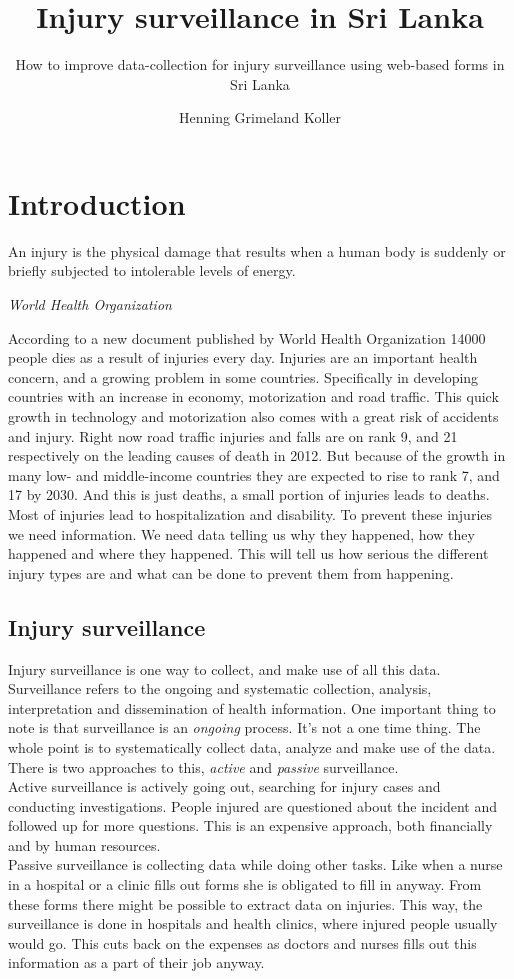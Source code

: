 \documentclass[UKenglish, 12pt]{article}
\title{Injury surveillance in Sri Lanka}
\subtitle{How to improve data-collection for injury surveillance
using web-based forms in Sri Lanka}
\author{Henning Grimeland Koller}
\newcommand{\WHO}{World Health Organization }
\begin{document}
\ififorside{}
\newpage

\section*{Introduction} 
\epigraph{ An injury is the physical damage that
results when a human body is suddenly or briefly subjected to intolerable
levels of energy.}{\textit{\WHO\cite{who-guide}}}

According to a new document published by \WHO\cite{who-article} 14000 people
dies as a result of injuries every day.  Injuries are an important health
concern, and a growing problem in some countries. Specifically in developing
countries with an increase in economy, motorization and road traffic.  This
quick growth in technology and motorization also comes with a great risk of
accidents and injury.  Right now road traffic injuries and falls are on rank 9,
and 21 respectively on the leading causes of death in
2012.\cite[4]{who-article} But because of the growth in many low- and
middle-income countries they are expected to rise to rank 7, and 17 by 2030.
And this is just deaths, a small portion of injuries leads to deaths. Most of
injuries lead to hospitalization and disability.  To prevent these injuries we
need information. We need data telling us why they happened, how they happened
and where they happened.  This will tell us how serious the different injury
types are and what can be done to prevent them from happening.

\subsection*{Injury surveillance}
Injury surveillance is one way to collect, and
make use of all this data.  Surveillance refers to the ongoing and systematic
collection, analysis, interpretation and dissemination of health
information.\cite[11]{who-guide} One important thing to note is that
surveillance is an \textit{ongoing} process.  It's not a one time thing. The
whole point is to systematically collect data, analyze and make use of the
data.  There is two approaches to this, \textit{active} and \textit{passive}
surveillance. \\Active surveillance is actively going out, searching for injury
cases and conducting investigations.  People injured are questioned about the
incident and followed up for more questions. This is an expensive approach,
both financially and by human resources. \\Passive surveillance is collecting
data while doing other tasks.  Like when a nurse in a hospital or a clinic
fills out forms she is obligated to fill in anyway. From these forms there
might be possible to extract data on injuries. This way, the surveillance is
done in hospitals and health clinics, where injured people usually would go.
This cuts back on the expenses as doctors and nurses fills out this information
as a part of their job anyway.\\
\end{document}
